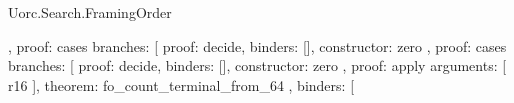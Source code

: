 \begin{lexlean}{Uorc.Search.FramingOrder}
\begin{semanticmodule}
{{{{{{{{{{{{{{{{{{{{{{{{{{{{{                                                                                    },
                                                                                    {
                                                                                      proof: cases{
                                                                                        branches: [
                                                                                          {
                                                                                            proof: decide{},
                                                                                            binders: [],
                                                                                            constructor: zero
                                                                                          },
                                                                                          {
                                                                                            proof: cases{
                                                                                              branches: [
                                                                                                {
                                                                                                  proof: decide{},
                                                                                                  binders: [],
                                                                                                  constructor: zero
                                                                                                },
                                                                                                {
                                                                                                  proof: apply{
                                                                                                    arguments: [
                                                                                                      r16
                                                                                                    ],
                                                                                                    theorem: fo_count_terminal_from_64
                                                                                                  },
                                                                                                  binders: [
}}}}}}}}}}}}}}}}}}}}}}}}}}}}}}}}}
\end{semanticmodule}
\end{lexlean}
